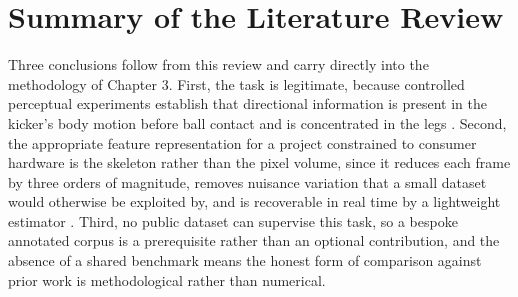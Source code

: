 \section{Summary of the Literature Review}

Three conclusions follow from this review and carry directly into the methodology of Chapter 3. First, the task is legitimate, because controlled perceptual experiments establish that directional information is present in the kicker's body motion before ball contact and is concentrated in the legs \cite{savelsbergh2002}. Second, the appropriate feature representation for a project constrained to consumer hardware is the skeleton rather than the pixel volume, since it reduces each frame by three orders of magnitude, removes nuisance variation that a small dataset would otherwise be exploited by, and is recoverable in real time by a lightweight estimator \cite{bazarevsky2020}. Third, no public dataset can supervise this task, so a bespoke annotated corpus is a prerequisite rather than an optional contribution, and the absence of a shared benchmark means the honest form of comparison against prior work is methodological rather than numerical.

\clearpage
